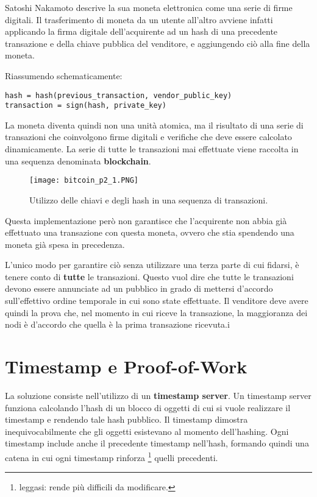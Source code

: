 Satoshi Nakamoto descrive la sua moneta elettronica come una serie di firme digitali. Il trasferimento di moneta da un utente all'altro avviene infatti applicando la firma digitale dell'acquirente ad un hash di una precedente transazione e della chiave pubblica del venditore, e aggiungendo ciò alla fine della moneta.

Riassumendo schematicamente:

\begin{verbatim}
hash = hash(previous_transaction, vendor_public_key)
transaction = sign(hash, private_key)
\end{verbatim}

La moneta diventa quindi non una unità atomica, ma il risultato di una serie di transazioni che coinvolgono firme digitali e verifiche che deve essere calcolato dinamicamente. La serie di tutte le transazioni mai effettuate viene raccolta in una sequenza denominata \textbf{blockchain}.

\begin{figure}[htbp]
\centering
\texttt{[image: bitcoin\_p2\_1.PNG]}
\caption{Utilizzo delle chiavi e degli hash in una sequenza di transazioni.\label{bitcoin_p2_1}}
\end{figure}

Questa implementazione però non garantisce che l'acquirente non abbia già effettuato una transazione con questa moneta, ovvero che stia spendendo una moneta già spesa in precedenza.

L'unico modo per garantire ciò senza utilizzare una terza parte di cui fidarsi, è tenere conto di \textbf{tutte} le transazioni. Questo vuol dire che tutte le transazioni devono essere annunciate ad un pubblico in grado di mettersi d'accordo sull'effettivo ordine temporale in cui sono state effettuate. Il venditore deve avere quindi la prova che, nel momento in cui riceve la transazione, la maggioranza dei nodi è d'accordo che quella è la prima transazione ricevuta.i

\section{Timestamp e Proof-of-Work}\label{timestamp-e-proof-of-work}

La soluzione consiste nell'utilizzo di un \textbf{timestamp server}. Un timestamp server funziona calcolando l'hash di un blocco di oggetti di cui si vuole realizzare il timestamp e rendendo tale hash pubblico. Il timestamp dimostra inequivocabilmente che gli oggetti esistevano al momento dell'hashing. Ogni timestamp include anche il precedente timestamp nell'hash, formando quindi una catena in cui ogni timestamp rinforza \footnote{leggasi: rende più difficili da modificare.} quelli precedenti.

